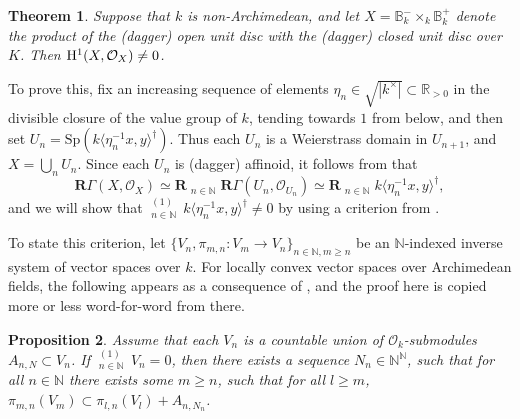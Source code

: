 \documentclass[11pt,leqno,a4paper]{amsart}
\newtheorem{theorem}{Theorem}
\newtheorem{prop}[theorem]{Proposition}
\theoremstyle{remark}
\theoremstyle{definition}
\numberwithin{equation}{theorem}
\def\B{{\mathbb B}}
\def\N{{\mathbb N}}
\def\R{{\mathbb R}}
\def\cO{{\mathcal O}}
\def\limpro{\mathop{\lim\limits_{\displaystyle\leftarrow}}}
\newcommand{\msp}[1]{\mathrm{Sp}\left(#1\right)}\newcommand{\spd}[1]{\mathrm{Spd}\left(#1\right)}
\newcommand{\weak}[1]{\langle #1\rangle^\dagger}
\newcommand{\norm}[1]{\left\vert#1\right\vert}
\begin{document}
\begin{theorem} \label{theo: main} Suppose that $k$ is non-Archimedean, and let $X=\B_k^{-}\times_k \B^{+}_k$ denote the product of the (dagger) open unit disc with the (dagger) closed unit disc over $K$. Then ${\rm H}^1(X,\cO_X)\neq 0$. 
\end{theorem}

To prove this, fix an increasing sequence of elements $\eta_n\in \sqrt{\norm{k^\times}}\subset \R_{>0}$ in the divisible closure of the value group of $k$, tending towards $1$ from below, and then set $U_n=\msp{k\weak{\eta_n^{-1}x,y}}$. Thus each $U_n$ is a Weierstrass domain in $U_{n+1}$, and $X=\bigcup_n U_n$. Since each $U_n$ is (dagger) affinoid, it follows from \cite[Proposition 3.1]{GK00} that
\[ \mathbf{R}\Gamma(X,\cO_X) \simeq \mathbf{R}\! \limpro_{n \in \N}\mathbf{R}\Gamma(U_n,\cO_{U_n})\simeq \mathbf{R}\!\limpro_{n\in \N}k\weak{\eta_n^{-1}x,y}, \]
and we will show that $\limpro_{n\in \N}^{(1)}\,k\weak{\eta_n^{-1}x,y}\neq 0$ by using a criterion from \cite{Wen03}. 

To state this criterion, let $\{V_n,\pi_{m,n}\colon V_m\to V_n \}_{n\in \N,m\geq n}$ be an $\N$-indexed inverse system of vector spaces over $k$. For locally convex vector spaces over Archimedean fields, the following appears as a consequence of \cite[Proposition 3.2.6]{Wen03}, and the proof here is copied more or less word-for-word from there.

\begin{prop} 
Assume that each $V_n$ is a countable union of $\cO_k$-submodules $A_{n,N}\subset V_n$. If $\limpro_{n\in \N}^{(1)}\,V_n =0$, then there exists a sequence $N_n\in \N^{\N}$, such that for all $n\in \N$ there exists some $m\geq n$, such that for all $l\geq m$, $\pi_{m,n}(V_m)\subset \pi_{l,n}(V_l)+A_{n,N_n}$.
\end{prop}
\end{document}

